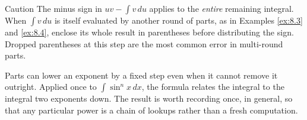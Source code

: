 \documentclass[a4paper,12pt,oneside]{memoir}
\begin{document}
\begin{envcaution}{Caution}{}{}
The minus sign in \(uv - \int v\,du\) applies to the \emph{entire} remaining integral. When \(\int v\,du\) is itself evaluated by another round of parts, as in Examples \ref{ex:8.3} and \ref{ex:8.4}, enclose its whole result in parentheses before distributing the sign. Dropped parentheses at this step are the most common error in multi-round parts.
\end{envcaution}
Parts can lower an exponent by a fixed step even when it cannot remove it outright. Applied once to \(\int\sin^{n}x\,dx\), the formula relates the integral to the integral two exponents down. The result is worth recording once, in general, so that any particular power is a chain of lookups rather than a fresh computation.
\end{document}
